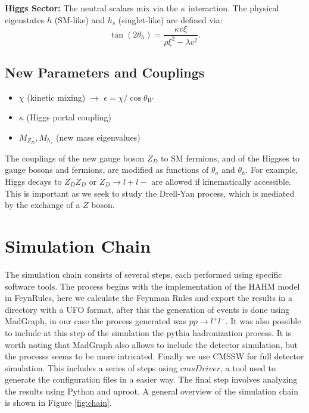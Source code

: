 \documentclass{CUP-JNL-DTM}%
\theoremstyle{definition}
\numberwithin{equation}{section}
\begin{document}
\textbf{Higgs Sector:} The neutral scalars mix via the $\kappa$ interaction. The physical eigenstates $h$ (SM-like) and $h_s$ (singlet-like) are defined via:
\begin{equation}
\tan(2\theta_h) = \frac{\kappa v \xi}{\rho \xi^2 - \lambda v^2}.
\end{equation}

\subsection{New Parameters and Couplings}

\begin{itemize}
    \item $\chi$ (kinetic mixing) $\rightarrow$ $\epsilon = \chi / \cos \theta_W$
    \item $\kappa$ (Higgs portal coupling)
    \item $M_{Z_D}, M_{h_s}$ (new mass eigenvalues)
\end{itemize}

The couplings of the new gauge boson $Z_D$ to SM fermions, and of the Higgses to gauge bosons and fermions, are modified as functions of $\theta_{a}$ and $\theta_{h}$. For example, Higgs decays to $Z_D Z_D$ or $Z_D \rightarrow l+ l-$ are allowed if kinematically accessible. This is important as we seek to study the Drell-Yan process, which is mediated by the exchange of a $Z$ boson.



\section{Simulation Chain}

The simulation chain consists of several steps, each performed using specific software tools. The process begins with the implementation of the HAHM model in FeynRules, here we calculate the Feynman Rules and export the results in a directory with a UFO format, after this the generation of events is done using MadGraph, in our case the process generated was $p p \rightarrow l^+ l^-$. It was also possible to include at this step of the simulation the pythia hadronization process. It is worth noting that MadGraph also allows to include the detector simulation, but the processs seems to be more intricated. Finally we use CMSSW for full detector simulation. This includes a series of steps using $cmsDriver$, a tool used to generate the configuration files in a easier way. The final step involves analyzing the results using Python and uproot. A general overview of the simulation chain is shown in Figure \ref{fig:chain}.
\end{document}
